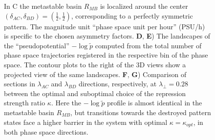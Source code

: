 \documentclass[a4paper,10pt]{article}
\begin{document}
\begin{figure}[h!]
{  In C the metastable basin $R_{MB}$ is localized around the center $(\delta_{AC},\delta_{BD})=(\frac{1}{2},\frac{1}{2})$, corresponding to a perfectly symmetric pattern. The magnitude unit ``phase space unit per hour'' (PSU/h) is specific to the chosen asymmetry factors.
  \textbf{D}, \textbf{E}) The landscapes of the ``pseudopotential'' $-\log \tilde{p}$ computed from the total number of phase space trajectories registered in the respective bin of the phase space.
  The contour plots to the right of the 3D views show a projected view of the same landscapes.
  \textbf{F}, \textbf{G}) Comparison of sections in $\lambda_{AC}$ and $\lambda_{BD}$ directions, respectively, at $\lambda_{\perp}=0.28$ between the optimal and suboptimal choice of the repression strength ratio $\kappa$. Here the $-\log \tilde{p}$ profile is almost identical in the metastable basin $R_{MB}$, but transitions towards the destroyed pattern states face a higher barrier in the system with optimal $\kappa = \kappa_{opt}$, in both phase space directions.
  \vspace{1EM}
  \label{Fig-VelocitiesComparison}
  }

\end{figure}
\end{document}
